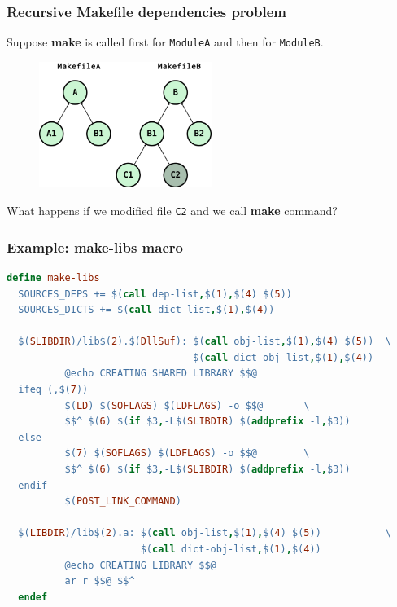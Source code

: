 \documentclass[11pt]{beamer}
\begin{document}

\begin{frame}[label=tree-problem]
  \frametitle{Recursive Makefile dependencies problem}

  Suppose \textbf{make} is called first for \texttt{ModuleA} and then for
  \texttt{ModuleB}.

  \begin{figure}[!htb]
    \centering
    \includegraphics[width=0.5\textwidth]{dep_problem}
  \end{figure}


  What happens if we modified file \texttt{C2} and we call \textbf{make}
  command?

  \vspace{3mm}
  \hyperlink{issues}{}
\end{frame}


\begin{frame}[fragile,label=make-libs]
  \frametitle{Example: make-libs macro}

  \begin{lstlisting}[language=make]
  define make-libs
  SOURCES_DEPS += $(call dep-list,$(1),$(4) $(5))
  SOURCES_DICTS += $(call dict-list,$(1),$(4))

  $(SLIBDIR)/lib$(2).$(DllSuf): $(call obj-list,$(1),$(4) $(5))  \
                                $(call dict-obj-list,$(1),$(4))
          @echo CREATING SHARED LIBRARY $$@
  ifeq (,$(7))
          $(LD) $(SOFLAGS) $(LDFLAGS) -o $$@       \
          $$^ $(6) $(if $3,-L$(SLIBDIR) $(addprefix -l,$3))
  else
          $(7) $(SOFLAGS) $(LDFLAGS) -o $$@        \
          $$^ $(6) $(if $3,-L$(SLIBDIR) $(addprefix -l,$3))
  endif
          $(POST_LINK_COMMAND)

  $(LIBDIR)/lib$(2).a: $(call obj-list,$(1),$(4) $(5))           \
                       $(call dict-obj-list,$(1),$(4))
          @echo CREATING LIBRARY $$@
          ar r $$@ $$^
  endef
  \end{lstlisting}
  \hyperlink{eval}{}
\end{frame}
\end{document}
